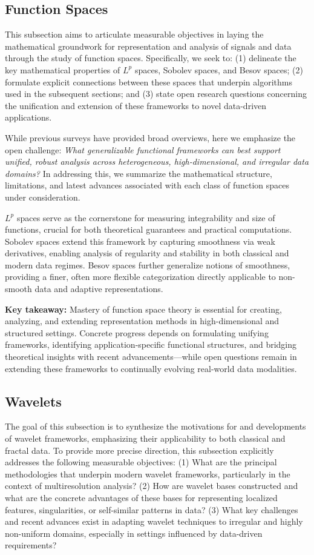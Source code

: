 \documentclass[sigconf]{acmart}
\begin{document}
\subsection{Function Spaces}

This subsection aims to articulate measurable objectives in laying the mathematical groundwork for representation and analysis of signals and data through the study of function spaces. Specifically, we seek to: (1) delineate the key mathematical properties of $L^p$ spaces, Sobolev spaces, and Besov spaces; (2) formulate explicit connections between these spaces that underpin algorithms used in the subsequent sections; and (3) state open research questions concerning the unification and extension of these frameworks to novel data-driven applications.

While previous surveys have provided broad overviews, here we emphasize the open challenge: \emph{What generalizable functional frameworks can best support unified, robust analysis across heterogeneous, high-dimensional, and irregular data domains?} In addressing this, we summarize the mathematical structure, limitations, and latest advances associated with each class of function spaces under consideration.

$L^p$ spaces serve as the cornerstone for measuring integrability and size of functions, crucial for both theoretical guarantees and practical computations. Sobolev spaces extend this framework by capturing smoothness via weak derivatives, enabling analysis of regularity and stability in both classical and modern data regimes. Besov spaces further generalize notions of smoothness, providing a finer, often more flexible categorization directly applicable to non-smooth data and adaptive representations.

\textbf{Key takeaway:} Mastery of function space theory is essential for creating, analyzing, and extending representation methods in high-dimensional and structured settings. Concrete progress depends on formulating unifying frameworks, identifying application-specific functional structures, and bridging theoretical insights with recent advancements—while open questions remain in extending these frameworks to continually evolving real-world data modalities.

\subsection{Wavelets}

The goal of this subsection is to synthesize the motivations for and developments of wavelet frameworks, emphasizing their applicability to both classical and fractal data. To provide more precise direction, this subsection explicitly addresses the following measurable objectives: (1) What are the principal methodologies that underpin modern wavelet frameworks, particularly in the context of multiresolution analysis? (2) How are wavelet bases constructed and what are the concrete advantages of these bases for representing localized features, singularities, or self-similar patterns in data? (3) What key challenges and recent advances exist in adapting wavelet techniques to irregular and highly non-uniform domains, especially in settings influenced by data-driven requirements?
\end{document}
